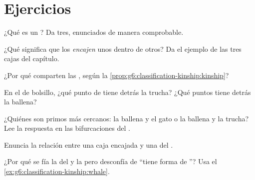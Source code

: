 \section{Ejercicios}

\begin{exercise}[$\star$]\label{exo:g6:classification-kinship:1}
¿Qué es un ? Da tres, enunciados de manera comprobable.
\end{exercise}

\begin{exercise}[$\star$]\label{exo:g6:classification-kinship:2}
¿Qué significa que los  \emph{encajen} unos dentro de otros?
Da el ejemplo de las tres cajas del capítulo.
\end{exercise}

\begin{exercise}[$\star$]\label{exo:g6:classification-kinship:3}
¿Por qué comparten  las , según la
\cref{prop:g6:classification-kinship:kinship}?
\end{exercise}

\begin{exercise}[$\star$]\label{exo:g6:classification-kinship:4}
En el  de bolsillo, ¿qué punto de  tiene detrás la trucha?
¿Qué puntos tiene detrás la ballena?
\end{exercise}

\begin{exercise}[$\star$]\label{exo:g6:classification-kinship:5}
¿Quiénes son primos más cercanos: la ballena y el gato o la ballena y
la trucha? Lee la respuesta en las bifurcaciones del .
\end{exercise}

\begin{exercise}[$\star$]\label{exo:g6:classification-kinship:6}
Enuncia la relación entre una caja encajada y una  del .
\end{exercise}

\begin{exercise}[$\star\star$]\label{exo:g6:classification-kinship:7}
¿Por qué se fía la  del  y la  pero desconfía de
``tiene forma de ''? Usa el \cref{ex:g6:classification-kinship:whale}.
\end{exercise}

